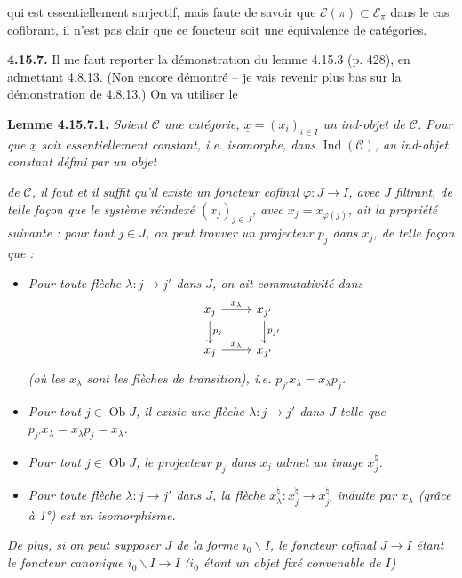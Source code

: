 \documentclass[11pt]{article}
\newcommand{\printedpage}[1]{\marginpar{\footnotesize p.~#1}}
\newcommand{\msp}[1]{\marginpar{\footnotesize [#1]}}
\newcommand{\ux}{\underline{x}}
\newcommand{\cC}{\mathcal{C}}
\newcommand{\Ob}{\operatorname{Ob}}
\newcommand{\Ind}{\operatorname{Ind}}
\begin{document}
\setcounter{footnote}{183}

\printedpage{169}
qui est essentiellement surjectif, mais faute de savoir que $\mathcal{E}(\pi) \subset \mathcal{E}_\pi$ dans le cas cofibrant, il n'est pas clair que ce foncteur soit une équivalence de catégories.

\textbf{4.15.7.} Il me faut reporter la démonstration du lemme 4.15.3 (p. 428), en admettant 4.8.13. (Non encore démontré -- je vais revenir plus bas sur la démonstration de 4.8.13.) On va utiliser le

\textbf{Lemme 4.15.7.1.} \textit{Soient $\cC$ une catégorie, $\ux = (x_i)_{i\in I}$ un ind-objet de $\cC$. Pour que $\ux$ soit essentiellement constant, i.e. isomorphe, dans} $\Ind(\cC)$\textit{, au ind-objet constant défini par un objet}

\msp{page 441}
\textit{de $\cC$, il faut et il suffit qu'il existe un foncteur cofinal $\varphi : J \longrightarrow I$, avec $J$ filtrant, de telle façon que le système réindexé $(x_j)_{j\in J}$, avec $x_j = x_{\varphi(j)}$, ait la propriété suivante : pour tout $j \in J$, on peut trouver un projecteur $p_j$ dans $x_j$, de telle façon que :}
\begin{itemize}
\item[\textit{1°)}] \textit{Pour toute flèche $\lambda : j \longrightarrow j'$ dans $J$, on ait commutativité dans}
\[
\begin{tikzcd}
x_j \arrow[r, "x_\lambda"] \arrow[d, "p_j"] & x_{j'} \arrow[d, "p_{j'}"] \\
x_j \arrow[r, "x_\lambda"] & x_{j'}
\end{tikzcd}
\]
\textit{(où les $x_\lambda$ sont les flèches de transition), i.e. $p_{j'}x_\lambda = x_\lambda p_j$.}
\item[\textit{2°)}] \textit{Pour tout $j \in \Ob J$, il existe une flèche $\lambda : j \longrightarrow j'$ dans $J$ telle que $p_{j'}x_\lambda = x_\lambda p_j = x_\lambda$.}
\item[\textit{3°)}] \textit{Pour tout $j \in \Ob J$, le projecteur $p_j$ dans $x_j$ admet un image $x_j^\natural$.} %
\item[\textit{4°)}] \textit{Pour toute flèche $\lambda : j \longrightarrow j'$ dans $J$, la flèche $x_\lambda^\natural : x_j^\natural \longrightarrow x_{j'}^\natural$ induite par $x_\lambda$ (grâce à 1°) est un isomorphisme.}
\end{itemize}
\textit{De plus, si on peut supposer $J$ de la forme $i_0\backslash I$, le foncteur cofinal $J \longrightarrow I$ étant le foncteur canonique $i_0\backslash I \longrightarrow I$ ($i_0$ étant un objet fixé convenable de $I$)}
\end{document}
